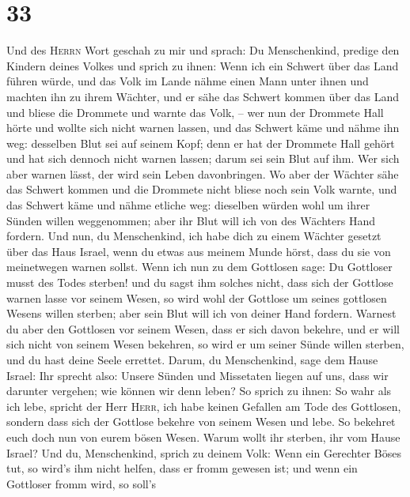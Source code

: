 \hypertarget{section-32}{%
\section{33}\label{section-32}}

 Und des \textsc{Herrn} Wort geschah zu mir und sprach:
 Du Menschenkind, predige den Kindern deines Volkes und
sprich zu ihnen: Wenn ich ein Schwert über das Land führen würde, und
das Volk im Lande nähme einen Mann unter ihnen und machten ihn zu ihrem
Wächter,  und er sähe das Schwert kommen über das Land und
bliese die Drommete und warnte das Volk, --  wer nun der
Drommete Hall hörte und wollte sich nicht warnen lassen, und das Schwert
käme und nähme ihn weg: desselben Blut sei auf seinem Kopf;
 denn er hat der Drommete Hall gehört und hat sich dennoch
nicht warnen lassen; darum sei sein Blut auf ihm. Wer sich aber warnen
lässt, der wird sein Leben davonbringen.  Wo aber der
Wächter sähe das Schwert kommen und die Drommete nicht bliese noch sein
Volk warnte, und das Schwert käme und nähme etliche weg: dieselben
würden wohl um ihrer Sünden willen weggenommen; aber ihr Blut will ich
von des Wächters Hand fordern.  Und nun, du Menschenkind,
ich habe dich zu einem Wächter gesetzt über das Haus Israel, wenn du
etwas aus meinem Munde hörst, dass du sie von meinetwegen warnen sollst.
 Wenn ich nun zu dem Gottlosen sage: Du Gottloser musst
des Todes sterben! und du sagst ihm solches nicht, dass sich der
Gottlose warnen lasse vor seinem Wesen, so wird wohl der Gottlose um
seines gottlosen Wesens willen sterben; aber sein Blut will ich von
deiner Hand fordern.  Warnest du aber den Gottlosen vor
seinem Wesen, dass er sich davon bekehre, und er will sich nicht von
seinem Wesen bekehren, so wird er um seiner Sünde willen sterben, und du
hast deine Seele errettet.  Darum, du Menschenkind, sage
dem Hause Israel: Ihr sprecht also: Unsere Sünden und Missetaten liegen
auf uns, dass wir darunter vergehen; wie können wir denn leben?
 So sprich zu ihnen: So wahr als ich lebe, spricht der
Herr \textsc{Herr}, ich habe keinen Gefallen am Tode des Gottlosen,
sondern dass sich der Gottlose bekehre von seinem Wesen und lebe. So
bekehret euch doch nun von eurem bösen Wesen. Warum wollt ihr sterben,
ihr vom Hause Israel?  Und du, Menschenkind, sprich zu
deinem Volk: Wenn ein Gerechter Böses tut, so wird's ihm nicht helfen,
dass er fromm gewesen ist; und wenn ein Gottloser fromm wird, so soll's
